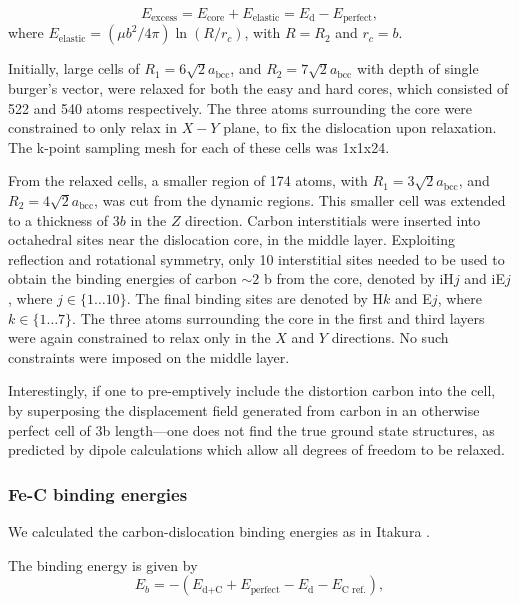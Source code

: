 \documentclass[a4paper,11pt]{article}
\numberwithin{equation}{chapter}
\numberwithin{listing}{chapter}
\begin{document}
\begin{equation}
 E_{\text{excess}} =   E_{\text{core}} + E_{\text{elastic}} = E_{\text{d}} - E_{\text{perfect}}   ,\label{eq:excessenergy}
 \end{equation}
where
\(E_{\text{elastic}} = ( \mu b^2 / 4\pi )\ln (R/ r_c)\), with \(R = R_2\) and \(r_c = b\).

Initially, large cells of \(R_1 = 6\sqrt{2}a_{\text{bcc}}\), and \(R_2 =
   7\sqrt{2}a_{\text{bcc}}\) with depth of single burger's vector, were relaxed
for both the easy and hard cores, which consisted of 522 and 540 atoms
respectively. The three atoms surrounding the core were constrained to only
relax in \(X-Y\) plane, to fix the dislocation upon relaxation.
The k-point sampling mesh for each of these cells was 1x1x24.

From the relaxed cells, a smaller region of 174 atoms, with \(R_1 = 3\sqrt{2}a_{\text{bcc}}\), and \(R_2
   = 4\sqrt{2}a_{\text{bcc}}\), was cut from the dynamic regions. This smaller cell was extended to a
thickness of 3\(b\) in the \(Z\) direction. Carbon interstitials were inserted into octahedral sites
near the dislocation core, in the middle layer. Exploiting reflection and rotational symmetry,
only 10 interstitial sites needed to be used to obtain the binding energies of carbon \(\sim2\) b from
the core, denoted by iH\(j\) and iE\(j\), where \(j \in \{1\dots10\}\). The final binding sites are denoted
by H\(k\) and E\(j\), where \(k \in \{1\dots7\}\). The three atoms surrounding the core in the first and
third layers were again constrained to relax only in the \(X\) and \(Y\) directions. No such
constraints were imposed on the middle layer.

Interestingly, if one to pre-emptively include the distortion
carbon into the cell, by superposing the displacement field
generated from carbon in an otherwise perfect cell of 3b
length---one does not find the true ground state structures, as
predicted by dipole calculations which allow all degrees of freedom
to be relaxed.

\subsubsection{Fe-C binding energies}
\label{sec:orgf0402cc}
We calculated the carbon-dislocation binding energies as in Itakura
 \cite{itakura13_effec_hydrog_atoms_screw_disloc}.

The binding energy is given by
\begin{equation}
E_b = -( E_{\text{d+C}} + E_{\text{perfect}}- E_{\text{d}} - E_{\text{C ref.} } ),
\end{equation}
\end{document}
